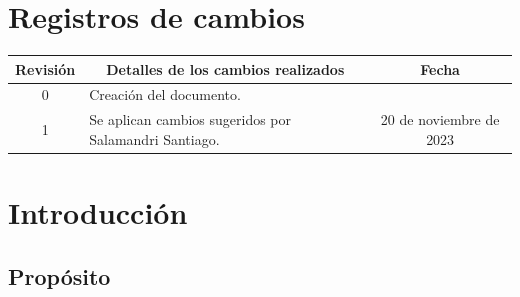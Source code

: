 \documentclass[
  11pt, %
  codirector, %
]{charter}
\begin{document}
\maketitle
\tableofcontents

\newpage

\section*{Registros de cambios}
\label{sec:registro}


\begin{table}[ht]
	\label{tab:registro}
	\centering
	\begin{tabularx}{\linewidth}{@{}|c|X|c|@{}}
		\hline
		\rowcolor[HTML]{C0C0C0}
		Revisión & \multicolumn{1}{c|}{\cellcolor[HTML]{C0C0C0}Detalles de los cambios realizados} & Fecha      \\ \hline
		0      & Creación del documento.                                 &\fechaInicioName \\ \hline

    		1      & Se aplican cambios sugeridos por Salamandri Santiago. & 20 de noviembre de 2023 \\ \hline


    \hline

	\end{tabularx}
	\label{sec:cierre}
\end{table}

\pagebreak


\section{Introducción}
\label{sec:org60390fa}



\subsection{Propósito}
\label{sec:org434c3ef}

\end{document}
